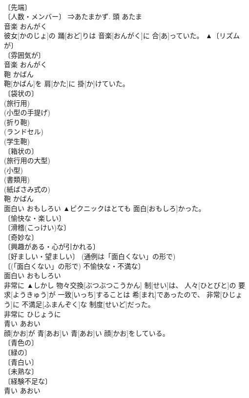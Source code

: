 \documentclass[8pt]{extreport}
\begin{document}
\begin{CJK}{UTF8}{min}
\\	〔先端〕 
\\	〔人数・メンバー〕 ⇒あたまかず.	頭	あたま	
\\	音楽	おんがく	
\\	彼女[かのじょ]の 踊[おど]りは 音楽[おんがく]に 合[あ]っていた。	▲〔リズムが〕 
\\	〔雰囲気が〕 
\\	音楽	おんがく	
\\	鞄	かばん	
\\	鞄[かばん]を 肩[かた]に 掛[か]けていた。	
\\	〔袋状の〕 
\\	(旅行用) 
\\	(小型の手提げ) 
\\	(折り鞄) 
\\	(ランドセル) 
\\	(学生鞄) 
\\	〔箱状の〕 
\\	(旅行用の大型) 
\\	(小型) 
\\	(書類用) 
\\	(紙ばさみ式の) 
\\	鞄	かばん	
\\	面白い	おもしろい	▲ピクニックはとても 面白[おもしろ]かった。	
\\	〔愉快な・楽しい〕 
\\	〔滑稽(こっけい)な〕 
\\	〔奇妙な〕 
\\	〔興趣がある・心が引かれる〕 
\\	〔好ましい・望ましい〕 (通例は「面白くない」の形で) 
\\	〔(「面白くない」の形で) 不愉快な・不満な〕 
\\	面白い	おもしろい	
\\	非常に		▲しかし 物々交換[ぶつぶつこうかん] 制[せい]は、 人々[ひとびと]の 要求[ようきゅう]が 一致[いっち]することは 希[まれ]であったので、 非常[ひじょう]に 不満足[ふまんぞく]な 制度[せいど]だった。	
\\	非常に	ひじょうに	
\\	青い	あおい	
\\	顔[かお]が 青[あお]い 青[あお]い 顔[かお]をしている。	
\\	〔青色の〕 
\\	〔緑の〕 
\\	〔青白い〕 
\\	〔未熟な〕 
\\	〔経験不足な〕 
\\	[⇒あおにさい]	青い	あおい	

\end{CJK}
\end{document}

